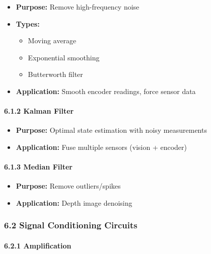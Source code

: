 \documentclass[
]{article}
\providecommand{\tightlist}{%
  \setlength{\itemsep}{0pt}\setlength{\parskip}{0pt}}
\begin{document}
\begin{itemize}
\tightlist
\item
  \textbf{Purpose:} Remove high-frequency noise
\item
  \textbf{Types:}

  \begin{itemize}
  \tightlist
  \item
    Moving average
  \item
    Exponential smoothing
  \item
    Butterworth filter
  \end{itemize}
\item
  \textbf{Application:} Smooth encoder readings, force sensor data
\end{itemize}

\hypertarget{kalman-filter}{%
\paragraph{6.1.2 Kalman Filter}\label{kalman-filter}}

\begin{itemize}
\tightlist
\item
  \textbf{Purpose:} Optimal state estimation with noisy measurements
\item
  \textbf{Application:} Fuse multiple sensors (vision + encoder)
\end{itemize}

\hypertarget{median-filter}{%
\paragraph{6.1.3 Median Filter}\label{median-filter}}

\begin{itemize}
\tightlist
\item
  \textbf{Purpose:} Remove outliers/spikes
\item
  \textbf{Application:} Depth image denoising
\end{itemize}

\hypertarget{signal-conditioning-circuits}{%
\subsubsection{6.2 Signal Conditioning
Circuits}\label{signal-conditioning-circuits}}

\hypertarget{amplification}{%
\paragraph{6.2.1 Amplification}\label{amplification}}
\end{document}
